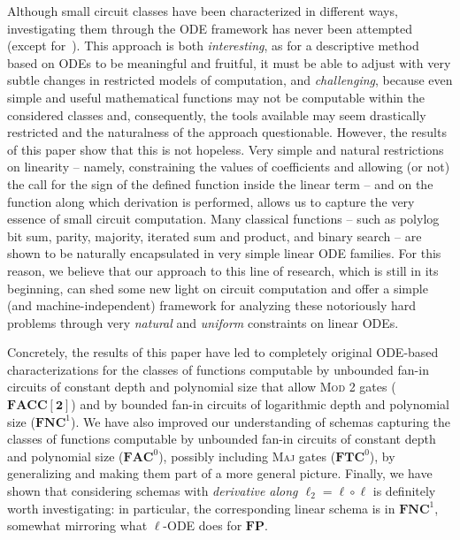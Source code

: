\documentclass[11pt, oneside]{article}
\newcommand{\FP}{\mathbf{FP}}
\newcommand{\NC}{\mathbf{FNC}}
\newcommand{\AC}{\mathbf{FAC}}
\newcommand{\TC}{\mathbf{FTC}}
\newcommand{\FACC}{\mathbf{FACC[2]}}
\theoremstyle{definition}
\begin{document}
Although small circuit classes have been characterized in different ways, investigating them through the ODE framework has never been attempted (except for~\cite{ADK24a}).
%
This approach is both \emph{interesting}, as for a descriptive method based on ODEs to be meaningful and fruitful, it must be able to adjust with very subtle changes in restricted models of computation, and \emph{challenging}, because even simple and useful mathematical functions may not be computable within the considered classes and, consequently, the tools available may seem drastically restricted and the naturalness of the approach questionable.
%
However, the results of this paper show that this is not hopeless. 
%
Very simple and natural restrictions on linearity – namely, constraining the values of coefficients and allowing (or not) the call for the sign of the defined function inside the linear term – and on the function along which derivation is performed, allows us to capture the very essence of small circuit computation.
%
%
Many classical functions – such as polylog bit sum, parity, majority, iterated sum and product, and binary search – are shown to be naturally encapsulated in very simple linear ODE families.   
%
For this reason, we believe that our approach to this line of research, which is still in its beginning, can shed some new light on circuit computation and offer a simple (and machine-independent) framework for analyzing these notoriously hard problems through very \emph{natural} and \emph{uniform} constraints on linear ODEs.


Concretely, the results of this paper have led to completely original ODE-based characterizations for the classes of functions computable by unbounded fan-in circuits of constant depth and polynomial size that allow \textsc{Mod 2} gates ($\FACC$) and by bounded fan-in circuits of logarithmic depth and polynomial size ($\NC^1$).
%
We have also improved our understanding of schemas capturing the classes of functions computable by unbounded fan-in circuits of constant depth and polynomial size ($\AC^0$), possibly including \textsc{Maj} gates ($\TC^0$), by generalizing and making them part of a more general picture.
%
Finally, we have shown that considering schemas with \emph{derivative along $\ell_2=\ell\circ\ell$} is definitely worth investigating: in particular, the corresponding linear schema is in $\NC^1$, somewhat mirroring what $\ell$-ODE does for $\FP$.
%
\end{document}
